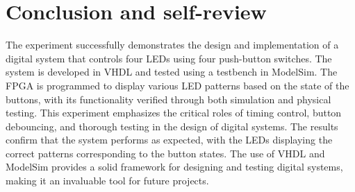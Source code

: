 \documentclass[]{article}
\begin{document}
\section{Conclusion and self-review}
\noindent The experiment successfully demonstrates the design and implementation of a digital system that controls four LEDs using four push-button switches. The system is developed in VHDL and tested using a testbench in ModelSim. The FPGA is programmed to display various LED patterns based on the state of the buttons, with its functionality verified through both simulation and physical testing. This experiment emphasizes the critical roles of timing control, button debouncing, and thorough testing in the design of digital systems. The results confirm that the system performs as expected, with the LEDs displaying the correct patterns corresponding to the button states. The use of VHDL and ModelSim provides a solid framework for designing and testing digital systems, making it an invaluable tool for future projects.
\end{document}
